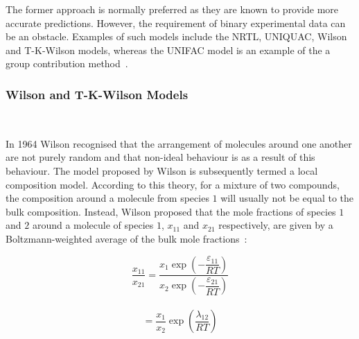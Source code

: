 The former approach is normally preferred as they are known to provide more accurate predictions. However, the requirement of binary experimental data can be an obstacle. Examples of such models include the NRTL, UNIQUAC, Wilson and T-K-Wilson models, whereas the UNIFAC model is an example of the a group contribution method~\cite{ThermophysicalProperties, ThermodynamicModels, UNIQUAC}.\

\subsubsection{Wilson and T-K-Wilson Models}\

In 1964 Wilson recognised that the arrangement of molecules around one another are not purely random and that non-ideal behaviour is as a result of this behaviour. The model proposed by Wilson is subsequently termed a local composition model. According to this theory, for a mixture of two compounds, the composition around a molecule from species $1$ will usually not be equal to the bulk composition. Instead, Wilson proposed that the mole fractions of species $1$ and $2$ around a molecule of species $1$, $x_{11}$ and $x_{21}$ respectively, are given by a Boltzmann-weighted average of the bulk mole fractions~\cite{ThermophysicalProperties,MolecularThermodynamicsOfFluidPhaseEquilibria, ThermodynamicModels, LocalCompositionModels}:\

\begin{equation}
\frac{x_{11}}{x_{21}} = \frac{x_{1}\exp\left(-\dfrac{\varepsilon_{11}}{RT}\right)}{x_{2}\exp\left(-\dfrac{\varepsilon_{21}}{RT}\right)}
\end{equation}\
\begin{equation}
 = \frac{x_{1}}{x_{2}}\exp\left(\frac{\lambda_{12}}{RT}\right) \label{CompositionalOrdering}
\end{equation}\


